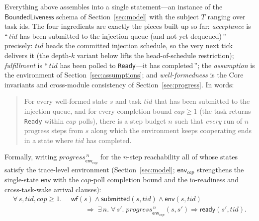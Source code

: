 \documentclass[11pt]{article}
\theoremstyle{plain}
\theoremstyle{definition}
\begin{document}
Everything above assembles into a single statement---an instance of the
$\mathsf{BoundedLiveness}$ schema of Section~\ref{sec:model} with the subject $T$ ranging
over task ids. The four ingredients are exactly the pieces built up so far:
\emph{acceptance} is ``\,$\mathit{tid}$ has been submitted to the injection queue (and not
yet dequeued)\,''---precisely: $\mathit{tid}$ heads the committed injection schedule, so the
very next tick delivers it (the depth-$k$ variant below lifts the head-of-schedule
restriction); \emph{fulfillment} is ``\,$\mathit{tid}$ has been polled to
\texttt{Ready}---it has completed\,''; the \emph{assumption} is the environment of
Section~\ref{sec:assumptions}; and \emph{well-formedness} is the Core invariants and
cross-module consistency of Section~\ref{sec:progress}. In words:

\begin{quote}
For every well-formed state $s$ and task $\mathit{tid}$ that has been submitted to the
injection queue, and for every completion bound $\mathit{cap} \ge 1$ (the task returns
\texttt{Ready} within $\mathit{cap}$ polls), there is a step budget $n$ such that
\emph{every} run of $n$ progress steps from $s$ along which the environment keeps
cooperating ends in a state where $\mathit{tid}$ has completed.
\end{quote}

\noindent Formally, writing $\mathit{progress}^{\,n}_{\mathsf{env}_{\mathit{cap}}}$ for the $n$-step
reachability all of whose states satisfy the trace-level environment (Section~\ref{sec:model};
$\mathsf{env}_{\mathit{cap}}$ strengthens the single-state $\mathsf{env}$ with the
$\mathit{cap}$-poll completion bound and the io-readiness and cross-task-wake arrival clauses):
\[
\begin{aligned}
  \forall\, s, \mathit{tid}, \mathit{cap} \ge 1.\;\;
    & \mathsf{wf}(s) \wedge \mathsf{submitted}(s,\mathit{tid}) \wedge \mathsf{env}(s,\mathit{tid}) \\
    & \qquad {}\Rightarrow\;
      \exists\, n.\;\forall\, s'.\;
      \mathit{progress}^{\,n}_{\mathsf{env}_{\mathit{cap}}}(s,s') \Rightarrow \mathsf{ready}(s',\mathit{tid}).
\end{aligned}
\]
\end{document}

